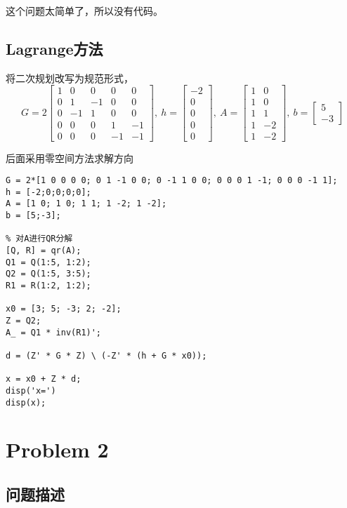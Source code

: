 \documentclass[11pt,a4paper]{article}
\begin{document}
这个问题太简单了，所以没有代码。
\subsection{Lagrange方法}

将二次规划改写为规范形式，
\[G=2\begin{bmatrix}
1 & 0 & 0 & 0 & 0\\
0 & 1 & -1 & 0 & 0\\
0 & -1 & 1 & 0 & 0\\
0 & 0 & 0 & 1 & -1\\
0 & 0 & 0 & -1 & -1
\end{bmatrix},~
h=\begin{bmatrix}
-2\\0\\0\\0\\0
\end{bmatrix},~
A=\begin{bmatrix}
1 & 0\\
1 & 0\\
1 & 1\\
1 & -2\\
1 &-2
\end{bmatrix},~
b=\begin{bmatrix}
5\\-3
\end{bmatrix}\]

后面采用零空间方法求解方向

\begin{lstlisting}[MATLAB]
% 原问题
G = 2*[1 0 0 0 0; 0 1 -1 0 0; 0 -1 1 0 0; 0 0 0 1 -1; 0 0 0 -1 1];
h = [-2;0;0;0;0];
A = [1 0; 1 0; 1 1; 1 -2; 1 -2];
b = [5;-3];

% 对A进行QR分解
[Q, R] = qr(A);
Q1 = Q(1:5, 1:2);
Q2 = Q(1:5, 3:5);
R1 = R(1:2, 1:2);

x0 = [3; 5; -3; 2; -2];
Z = Q2;
A_ = Q1 * inv(R1)';

d = (Z' * G * Z) \ (-Z' * (h + G * x0));

x = x0 + Z * d;
disp('x=')
disp(x);
\end{lstlisting}
\section{Problem 2}

\subsection{问题描述}
\end{document}
